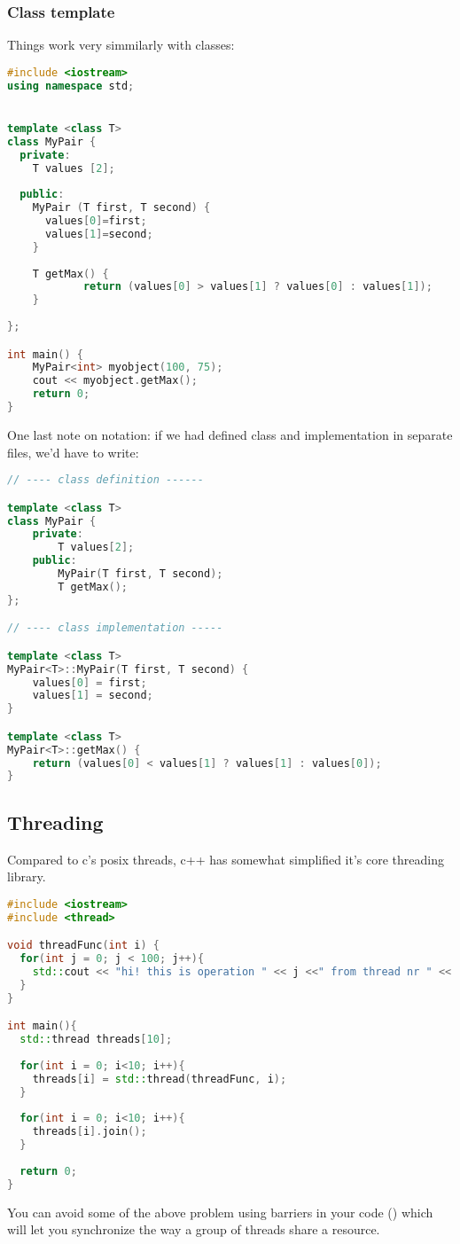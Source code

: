 \subsubsection{Class template}

Things work very simmilarly with classes: 

\begin{lstlisting}[language=c++]
#include <iostream>
using namespace std;


template <class T>
class MyPair {
  private:  
    T values [2];
  
  public:
    MyPair (T first, T second) {
      values[0]=first; 
      values[1]=second;
    }
    
    T getMax() {
    		return (values[0] > values[1] ? values[0] : values[1]);
    }
    
};

int main() {
	MyPair<int> myobject(100, 75);
  	cout << myobject.getMax();
  	return 0;
}

\end{lstlisting}

One last note on notation: if we had defined class and implementation in separate files, we'd have to write: 

\begin{lstlisting}[language=c++]
// ---- class definition ------

template <class T>
class MyPair {
	private: 
		T values[2];
	public:
		MyPair(T first, T second);
		T getMax();
};

// ---- class implementation -----

template <class T>
MyPair<T>::MyPair(T first, T second) {
	values[0] = first;
	values[1] = second;
}

template <class T>
MyPair<T>::getMax() {
	return (values[0] < values[1] ? values[1] : values[0]);
}

\end{lstlisting}

\subsection{Threading} 
Compared to c's posix threads, c++ has somewhat simplified it's core threading library. 
\begin{lstlisting}[language=c++]
#include <iostream>
#include <thread>

void threadFunc(int i) {
  for(int j = 0; j < 100; j++){
    std::cout << "hi! this is operation " << j <<" from thread nr " << i << std::endl;
  }
}

int main(){
  std::thread threads[10];
  
  for(int i = 0; i<10; i++){
    threads[i] = std::thread(threadFunc, i);
  }
  
  for(int i = 0; i<10; i++){
    threads[i].join();
  }
  
  return 0;
}
\end{lstlisting}
You can avoid some of the above problem using barriers in your code () which will let you synchronize the way a group of threads share a resource.




